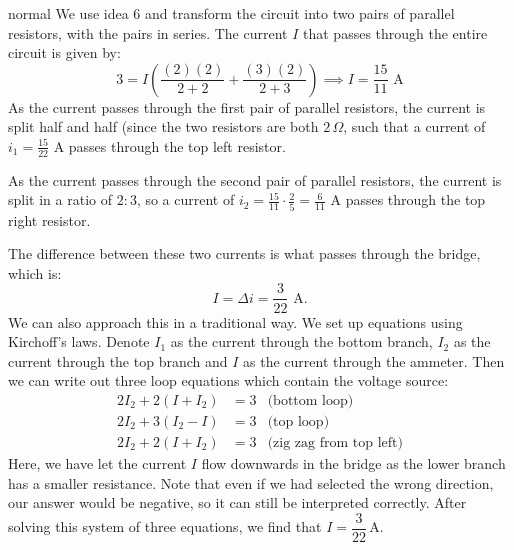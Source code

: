 \begin{solution}{normal}
We use idea 6 and transform the circuit into two pairs of parallel resistors, with the pairs in series. The current $I$ that passes through the entire circuit is given by:
$$3 = I\left(\frac{(2)(2)}{2+2} + \frac{(3)(2)}{2+3}\right) \implies I = \frac{15}{11} \text{ A}$$As the current passes through the first pair of parallel resistors, the current is split half and half (since the two resistors are both $2\, \Omega$, such that a current of $i_1=\frac{15}{22} \text{ A}$ passes through the top left resistor.

As the current passes through the second pair of parallel resistors, the current is split in a ratio of $2:3$, so a current of $i_2=\frac{15}{11}\cdot \frac{2}{5} = \frac{6}{11}\text{ A}$ passes through the top right resistor.

The difference between these two currents is what passes through the bridge, which is:
$$I = \Delta i = \boxed{\frac{3}{22} \text{ A}}.$$
\tcbline
We can also approach this in a traditional way. We set up equations using Kirchoff's laws. Denote $I_1$ as the current through the bottom branch, $I_2$ as the current through the top branch and $I$ as the current through the ammeter. Then we can write out three loop equations which contain the voltage source:
\begin{align*}
2I_2+2(I+I_2) &= 3 & \text{(bottom loop)}\\
2I_2+3(I_2-I) &= 3 & \text{(top loop)}\\
2I_2 + 2(I+I_2) &= 3 & \text{(zig zag from top left)}
\end{align*}Here, we have let the current $I$ flow downwards in the bridge as the lower branch has a smaller resistance. Note that even if we had selected the wrong direction, our answer would be negative, so it can still be interpreted correctly. After solving this system of three equations, we find that $\boxed{I = \dfrac{3}{22}\,\mathrm{A}}$.
\end{solution}